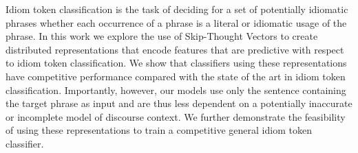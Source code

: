 Idiom token classification is the task of deciding for a set of potentially idiomatic phrases whether each occurrence of a phrase is a literal or idiomatic usage of the phrase. In this work we explore the use of Skip-Thought Vectors to create distributed representations that encode features that are predictive with respect to idiom token classification. We show that classifiers using these representations have competitive performance compared with the state of the art in idiom token classification. Importantly, however, our models use only the sentence containing the target phrase as input and are thus less dependent on a potentially inaccurate or incomplete model of discourse context. We further demonstrate the feasibility of using these representations to train a competitive general idiom token classifier.
